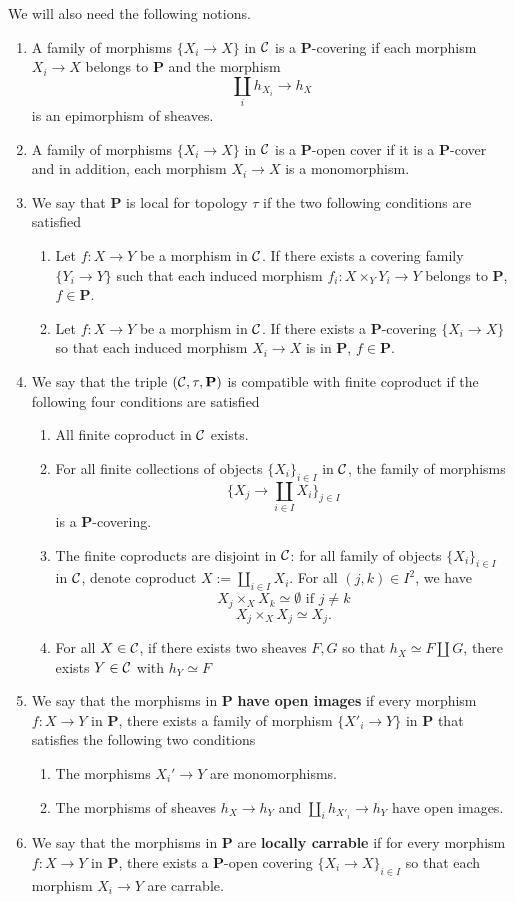 \documentclass{tufte-book} %
\numberwithin{dummy}{section}
\newcommand{\calc}{{\cal C}}
\newcommand{\lrta}{\longrightarrow}
\newcommand{\bfp}{\mathbf{P}}
\begin{document}
We will also need the following notions.
\begin{enumerate}
\item A family of morphisms $\{X_i\lrta X\}$ in $\calc$ is a $\bfp$-covering if each morphism $X_i\lrta X$ belongs to $\bfp$ and the morphism
$$
\coprod_i h_{X_i}\lrta h_X
$$
is an epimorphism of sheaves.
\item A family of morphisms $\{X_i\lrta X\}$ in $\calc$ is a $\bfp$-open cover if it is a $\bfp$-cover and in addition, each morphism $X_i\lrta X$ is a monomorphism.
\item We say that $\bfp$ is local for topology $\tau$ if the two following conditions are satisfied
\begin{enumerate}[label=(\alph*)]
\item Let $f:X\lrta Y$ be a morphism in $\calc$. If there exists a covering family $\{Y_i\lrta Y\}$ such that each induced morphism $f_i:X\times_Y Y_i\lrta Y$ belongs to $\bfp$, $f\in\bfp$.
\item Let $f:X\lrta Y$ be a morphism in $\calc$. If there exists a $\bfp$-covering $\{X_i\lrta X\}$ so that each induced morphism $X_i\lrta X$ is in $\bfp$,\sidenote{{\color{red}Shouldn't it be $X_i\lrta Y$?}} $f\in \bfp$.
\end{enumerate}
\item We say that the triple $(\calc,\tau,\bfp)$ is compatible with finite coproduct if the following four conditions are satisfied
\begin{enumerate}[label=(\alph*)]
\item All finite coproduct in $\calc$ exists.
\item For all finite collections of objects $\{X_i\}_{i\in I}$ in $\calc$, the family of morphisms
$$
\{X_j\lrta\coprod_{i\in I}X_i\}_{j\in I}
$$
is a $\bfp$-covering.
\item The finite coproducts are disjoint in $\calc$: for all family of objects $\{X_i\}_{i\in I}$ in $\calc$, denote coproduct $X:=\coprod_{i\in I}X_i$. For all $(j,k)\in I^2$, we have
$$
X_j\times_X X_k\simeq \emptyset \text{ if }j\neq k
$$
$$
X_j\times_X X_j\simeq X_j.
$$
\item For all $X\in\calc$, if there exists two sheaves $F,G$ so that $h_X\simeq F\coprod G$, there exists $Y\in \calc$ with $h_Y\simeq F$
\end{enumerate}
\item We say that the morphisms in $\bfp$ \textbf{have open images} if every morphism $f:X\lrta Y$ in $\bfp$, there exists a family of morphism $\{X'_i\lrta Y\}$ in $\bfp$ that satisfies the following two conditions
\begin{enumerate}[label=(\alph*)]
\item The morphisms $X_i'\lrta Y$ are monomorphisms.
\item The morphisms of sheaves $h_X\lrta h_Y$ and $\coprod_i h_{X'_i}\lrta h_Y$ have open images.
  \end{enumerate}
\item We say that the morphisms in $\bfp$ are \textbf{locally carrable} if for every morphism $f:X\lrta Y$ in $\bfp$, there exists a $\bfp$-open covering $\{X_i\lrta X\}_{i\in I}$ so that each morphism $X_i\lrta Y$ are carrable.
\end{enumerate}
\end{document}
